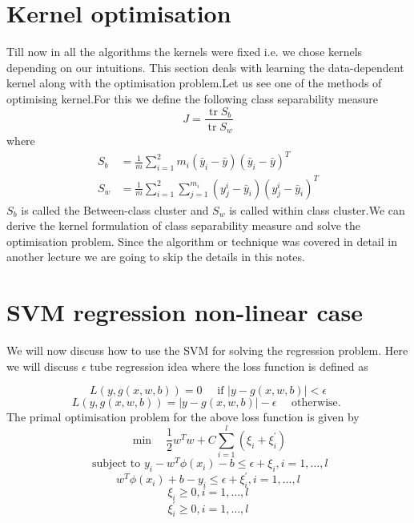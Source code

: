 \documentclass[../main.tex]{subfiles}
\begin{document}
\section{Kernel optimisation}
Till now in all the algorithms the kernels were fixed i.e. we chose kernels depending on our intuitions. This section deals with learning the data-dependent kernel along with the optimisation problem.Let us see one of the methods of optimising kernel.For this we define the following class separability measure $$J=\frac{\operatorname{tr} S_{b}}{\operatorname{tr} S_{w}}$$ 
where 
$$
\begin{aligned}
S_{b} &=\frac{1}{m} \sum_{i=1}^{2} m_{i}\left(\bar{y}_{i}-\bar{y}\right)\left(\bar{y}_{i}-\bar{y}\right)^{T} \\
S_{w} &=\frac{1}{m} \sum_{i=1}^{2} \sum_{j=1}^{m_{i}}\left(y_{j}^{i}-\bar{y}_{i}\right)\left(y_{j}^{i}-\bar{y}_{i}\right)^{T}
\end{aligned}
$$
$S_{b}$ is called the Between-class cluster and $S_{w}$ is called within class cluster.We can derive the kernel formulation of class separability measure and solve the optimisation problem. Since the algorithm or technique was covered in detail in another lecture we are going to skip the details in this notes.

\section{SVM regression non-linear case}
We will now discuss how to use the SVM for solving the regression problem. Here we will discuss $\epsilon$ tube regression idea where the loss function is defined as  

$$L(y, g(x, w, b)) =0 \quad \text { if }|y-g(x, w, b)|<\epsilon$$
$$L(y, g(x, w, b)) =|y-g(x, w, b)|-\epsilon \quad \text { otherwise. }
$$
The primal optimisation problem for the above loss function is given by 
$$
\min \quad  \frac{1}{2} w^{T} w+C \sum_{i=1}^{l}\left(\xi_{i}+\xi_{i}^{\prime}\right)$$
$$
\text { subject to }  y_{i}-w^{T} \phi\left(x_{i}\right)-b \leq \epsilon+\xi_{i}, i=1, \ldots, l$$
$$ w^{T} \phi\left(x_{i}\right)+b-y_{i} \leq \epsilon+\xi_{i}^{\prime}, i=1, \ldots, l$$
$$ \xi_{i} \geq 0, i=1, \ldots, l $$
$$ \xi_{i}^{\prime} \geq 0, i=1, \ldots, l
$$
\end{document}
